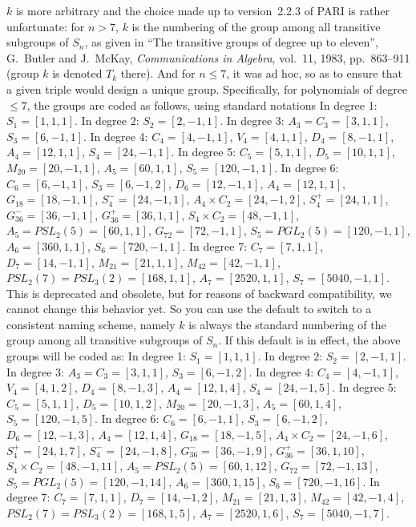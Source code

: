 $k$ is more arbitrary and the choice made up to version~2.2.3 of PARI is rather
unfortunate: for $n > 7$, $k$ is the numbering of the group among all
transitive subgroups of $S_n$, as given in ``The transitive groups of degree up
to eleven'', G.~Butler and J.~McKay, \emph{Communications in Algebra}, vol.~11,
1983,
pp.~863--911 (group $k$ is denoted $T_k$ there). And for $n \leq 7$, it was ad
hoc, so as to ensure that a given triple would design a unique group.
Specifically, for polynomials of degree $\leq 7$, the groups are coded as
follows, using standard notations
\smallskip
In degree 1: $S_1=[1,1,1]$.
\smallskip
In degree 2: $S_2=[2,-1,1]$.
\smallskip
In degree 3: $A_3=C_3=[3,1,1]$, $S_3=[6,-1,1]$.
\smallskip
In degree 4: $C_4=[4,-1,1]$, $V_4=[4,1,1]$, $D_4=[8,-1,1]$, $A_4=[12,1,1]$,
$S_4=[24,-1,1]$.
\smallskip
In degree 5: $C_5=[5,1,1]$, $D_5=[10,1,1]$, $M_{20}=[20,-1,1]$,
$A_5=[60,1,1]$, $S_5=[120,-1,1]$.
\smallskip
In degree 6: $C_6=[6,-1,1]$, $S_3=[6,-1,2]$, $D_6=[12,-1,1]$, $A_4=[12,1,1]$,
$G_{18}=[18,-1,1]$, $S_4^-=[24,-1,1]$, $A_4\times C_2=[24,-1,2]$,
$S_4^+=[24,1,1]$, $G_{36}^-=[36,-1,1]$, $G_{36}^+=[36,1,1]$,
$S_4\times C_2=[48,-1,1]$, $A_5=PSL_2(5)=[60,1,1]$, $G_{72}=[72,-1,1]$,
$S_5=PGL_2(5)=[120,-1,1]$, $A_6=[360,1,1]$, $S_6=[720,-1,1]$.
\smallskip
In degree 7: $C_7=[7,1,1]$, $D_7=[14,-1,1]$, $M_{21}=[21,1,1]$,
$M_{42}=[42,-1,1]$, $PSL_2(7)=PSL_3(2)=[168,1,1]$, $A_7=[2520,1,1]$,
$S_7=[5040,-1,1]$.
\smallskip
This is deprecated and obsolete, but for reasons of backward compatibility,
we cannot change this behavior yet. So you can use the default
 to switch to a consistent naming scheme, namely $k$ is
always the standard numbering of the group among all transitive subgroups of
$S_n$. If this default is in effect, the above groups will be coded as:
\smallskip
In degree 1: $S_1=[1,1,1]$.
\smallskip
In degree 2: $S_2=[2,-1,1]$.
\smallskip
In degree 3: $A_3=C_3=[3,1,1]$, $S_3=[6,-1,2]$.
\smallskip
In degree 4: $C_4=[4,-1,1]$, $V_4=[4,1,2]$, $D_4=[8,-1,3]$, $A_4=[12,1,4]$,
$S_4=[24,-1,5]$.
\smallskip
In degree 5: $C_5=[5,1,1]$, $D_5=[10,1,2]$, $M_{20}=[20,-1,3]$,
$A_5=[60,1,4]$, $S_5=[120,-1,5]$.
\smallskip
In degree 6: $C_6=[6,-1,1]$, $S_3=[6,-1,2]$, $D_6=[12,-1,3]$, $A_4=[12,1,4]$,
$G_{18}=[18,-1,5]$, $A_4\times C_2=[24,-1,6]$, $S_4^+=[24,1,7]$,
$S_4^-=[24,-1,8]$, $G_{36}^-=[36,-1,9]$, $G_{36}^+=[36,1,10]$,
$S_4\times C_2=[48,-1,11]$, $A_5=PSL_2(5)=[60,1,12]$, $G_{72}=[72,-1,13]$,
$S_5=PGL_2(5)=[120,-1,14]$, $A_6=[360,1,15]$, $S_6=[720,-1,16]$.
\smallskip
In degree 7: $C_7=[7,1,1]$, $D_7=[14,-1,2]$, $M_{21}=[21,1,3]$,
$M_{42}=[42,-1,4]$, $PSL_2(7)=PSL_3(2)=[168,1,5]$, $A_7=[2520,1,6]$,
$S_7=[5040,-1,7]$.
\smallskip

